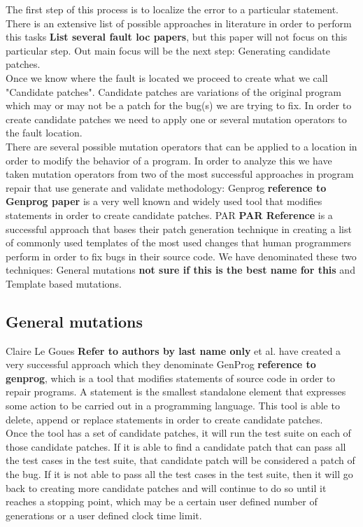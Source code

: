 \documentclass[conference]{IEEEtran}
\newcommand{\todo}[1]
  {{\scriptsize \textbf{\color{red} {#1}}}}
\begin{document}
The first step of this process is to localize the error to a particular statement. There is an extensive list of possible approaches in literature in order to perform this tasks \todo{List several fault loc papers}, but this paper will not focus on this particular step. Out main focus will be the next step: Generating candidate patches.\\
Once we know where the fault is located we proceed to create what we call "Candidate patches". Candidate patches are variations of the original program which may or may not be a patch for the bug(s) we are trying to fix. In order to create candidate patches we need to apply one or several mutation operators to the fault location. \\
There are several possible mutation operators that can be applied to a location in order to modify the behavior of a program. In order to analyze this we have taken mutation operators from two of the most successful approaches in program repair that use generate and validate methodology: Genprog \todo{reference to Genprog paper} is a very well known and widely used tool that modifies statements in order to create candidate patches.   PAR \todo{PAR Reference} is a successful approach that bases their patch generation technique in creating a list of commonly used templates of the most used changes that human programmers perform in order to fix bugs in their source code. We have denominated these two techniques: General mutations \todo{not sure if this is the best name for this} and Template based mutations.


\subsection{General mutations}
Claire Le Goues\todo{Refer to authors by last name only} et al. have created a very successful approach which they denominate GenProg \todo{reference to genprog}, which is a tool that modifies statements of source code in order to repair programs. A statement is the smallest standalone element that expresses some action to be carried out in a programming language. This tool is able to delete, append or replace statements in order to create candidate patches.\\
Once the tool has a set of candidate patches, it will run the test suite on each of those candidate patches. If it is able to find a candidate patch that can pass all the test cases in the test suite, that candidate patch will be considered a patch of the bug. If it is not able to pass all the test cases in the test suite, then it will go back to creating more candidate patches and will continue to do so until it reaches a stopping point, which may be a certain user defined number of generations or a user defined clock time limit.
\end{document}
